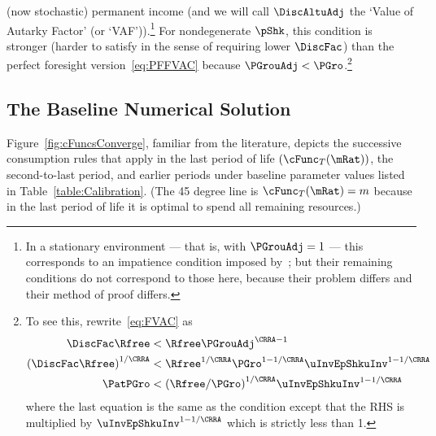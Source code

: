 \documentclass[BufferStockTheory]{subfiles}
\begin{document}
(now stochastic) permanent income (and we will call $\DiscAltuAdj$ the `Value of Autarky Factor' (or `VAF')).\footnote{In a stationary environment --- that is, with $\PGrouAdj=1$ --- this corresponds to an impatience condition imposed by~\cite{mstIncFluct}; but their remaining conditions do not correspond to those here, because their problem differs and their method of proof differs.}  For nondegenerate $\pShk$, this
condition is stronger
(harder to satisfy in the sense of requiring lower $\DiscFac$) than
the perfect foresight version~\eqref{eq:PFFVAC} because $\PGrouAdj <
\PGro$.\footnote{To see this, rewrite~\eqref{eq:FVAC} as
  \begin{align*}
    \DiscFac \Rfree & < \Rfree \PGrouAdj^{\CRRA-1}
    \\ {(\DiscFac \Rfree)}^{1/\CRRA}  & < \Rfree^{1/\CRRA} \PGro^{1-1/\CRRA} \uInvEpShkuInv^{1-1/\CRRA}
    \\ \PatPGro & < {(\Rfree/\PGro)}^{1/\CRRA} \uInvEpShkuInv^{1-1/\CRRA}
  \end{align*}
  where the last equation is the same as the {\PFFVAC} condition except that the
  RHS is multiplied by $\uInvEpShkuInv^{1-1/\CRRA}$ which is strictly less than 1.}


\hypertarget{Baseline-Numerical-Solution}{}
\subsection{The Baseline Numerical Solution}

Figure~\ref{fig:cFuncsConverge}, familiar from the literature, depicts the successive consumption rules that apply in the last period of life $(\cFunc_{T}(\mRat))$, the second-to-last period, and earlier periods under baseline parameter values listed in Table~\ref{table:Calibration}.  (The 45 degree line is $\cFunc_{T}(\mRat) = m$ because in the last period of life it is optimal to spend all remaining resources.)

\hypertarget{Calibration}{}



\hypertarget{Symbols}{}




\renewcommand{\figName}{Convergence-of-the-Consumption-Rules} %
\renewcommand{\figFile}{cFuncsConverge} %

\hypertarget{\figFile}{}
\hypertarget{\figName}{}
\end{document}
